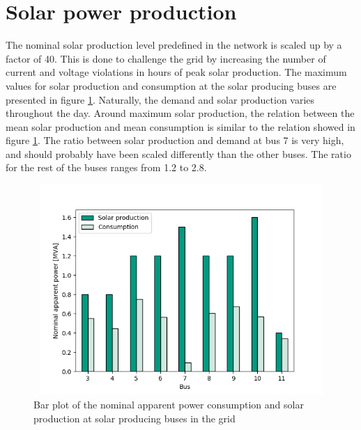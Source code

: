 \documentclass[class=book, crop=false, 11pt]{standalone}
\begin{document}
\section{Solar power production}
The nominal solar production level predefined in the network is scaled up by a factor of 40. This is done to challenge the grid by increasing the number of current and voltage violations in hours of peak solar production. The maximum values for solar production and consumption at the solar producing buses are presented in figure \ref{fig:discussion:nominal_sgen}. Naturally, the demand and solar production varies throughout the day. Around maximum solar production, the relation between the mean solar production and mean consumption is similar to the relation showed in figure \ref{fig:discussion:nominal_sgen}. The ratio between solar production and demand at bus 7 is very high, and should probably have been scaled differently than the other buses. The ratio for the rest of the buses ranges from 1.2 to 2.8. 

\begin{figure}[h]
    \center
\includegraphics[height=8cm, width=12cm]{figures/nominal_sgen.png}
    \caption[size = 9]{Bar plot of the nominal apparent power consumption and solar production at solar producing buses in the grid}
    \label{fig:discussion:nominal_sgen}
\end{figure}
\end{document}
